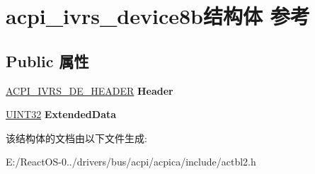\hypertarget{structacpi__ivrs__device8b}{}\section{acpi\+\_\+ivrs\+\_\+device8b结构体 参考}
\label{structacpi__ivrs__device8b}
\subsection*{Public 属性}
\begin{DoxyCompactItemize}
\item 
\mbox{\label{structacpi__ivrs__device8b_a7c73d8bb27541f244a24ae83948bff14}} 
\hyperlink{structacpi__ivrs__de__header}{A\+C\+P\+I\+\_\+\+I\+V\+R\+S\+\_\+\+D\+E\+\_\+\+H\+E\+A\+D\+ER} {\bfseries Header}
\item 
\mbox{\label{structacpi__ivrs__device8b_a5095660f0f77310fd5137ffe4b3d83e5}} 
\hyperlink{_processor_bind_8h_ae1e6edbbc26d6fbc71a90190d0266018}{U\+I\+N\+T32} {\bfseries Extended\+Data}
\end{DoxyCompactItemize}


该结构体的文档由以下文件生成\+:\begin{DoxyCompactItemize}
\item 
E\+:/\+React\+O\+S-\/0../drivers/bus/acpi/acpica/include/actbl2.\+h\end{DoxyCompactItemize}
